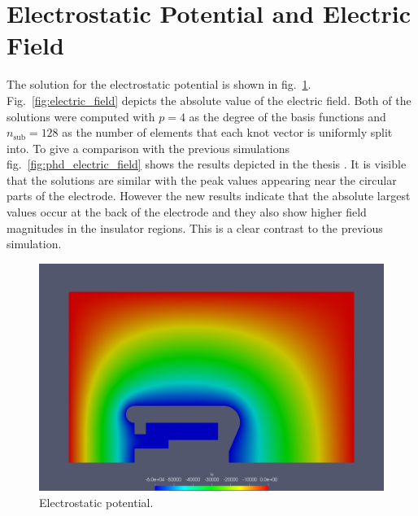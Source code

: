 \section{Electrostatic Potential and Electric Field}
\label{sec:potential_field}
The solution for the electrostatic potential is shown in fig.~\ref{fig:potential}. Fig.~\ref{fig:electric_field} depicts the absolute value of the electric field.
Both of the solutions were computed with $p=4$ as the degree of the basis functions and $n_\mathrm{sub}=128$ as the number of elements that each knot vector is uniformly split into.
To give a comparison with the previous simulations fig.~\ref{fig:phd_electric_field} shows the results depicted in the thesis \cite{thesis}. It is visible that the solutions are similar with the peak values appearing near the circular parts of the electrode. However the new results indicate that the absolute largest values occur at the back of the electrode and they also show higher field magnitudes in the insulator regions. This is a clear contrast to the previous simulation.

\begin{center}
\begin{figure}[H]
  \includegraphics[width=\textwidth]{figures/insulator/potential}
  \caption{Electrostatic potential.}
  \label{fig:potential}
\end{figure}
\end{center}

